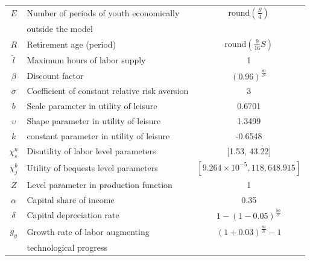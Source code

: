 \documentclass[letterpaper,12pt]{article}
\theoremstyle{definition}
\begin{document}
\begin{spacing}{1.5}
\begin{table}[htbp]
\begin{threeparttable}
\begin{tabular}{>{\footnotesize}c |>{\footnotesize}l |>{\footnotesize}c}
        $E$ & Number of periods of youth economically & $\text{round}\left(\frac{S}{4}\right)$ \\[-2mm]
        & \quad outside the model & \\
        $R$ & Retirement age (period) & $\text{round}\left(\frac{9}{16}S\right)$ \\
        \hline
        $\tilde{l}$ & Maximum hours of labor supply & 1 \\
        $\beta$ & Discount factor & $(0.96)^\frac{80}{S}$ \\
        $\sigma$ & Coefficient of constant relative risk aversion & 3 \\
        $b$ & Scale parameter in utility of leisure & 0.6701 \\
        $\upsilon$ & Shape parameter in utility of leisure & 1.3499 \\
        $k$ & constant parameter in utility of leisure & -0.6548 \\
        $\chi^n_s$ & Disutility of labor level parameters & [1.53, 43.22] \\
        $\chi^b_j$ & Utility of bequests level parameters &  $[9.264 \times 10^{-5}, 118,648.915]$ \\
        \hline
        $Z$ & Level parameter in production function & 1 \\
        $\alpha$ & Capital share of income & 0.35 \\
        $\delta$ & Capital depreciation rate & $1-(1-0.05)^\frac{80}{S}$ \\
        $g_y$ & Growth rate of labor augmenting & $(1+0.03)^\frac{80}{S}-1$ \\[-2mm]
        & \quad technological progress & \\

\end{tabular}
\end{threeparttable}
\end{table}
\end{spacing}
\end{document}
